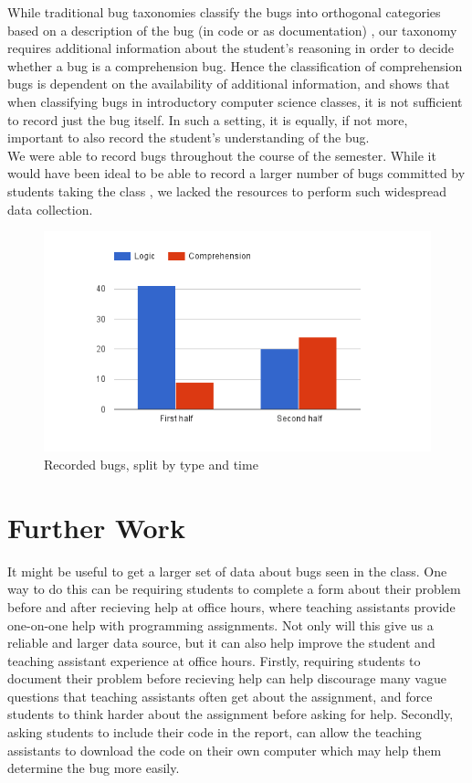 \documentclass{sig-alternate}
\begin{document}
While traditional bug taxonomies classify the bugs into orthogonal categories based on a description of the bug (in code or as documentation) \cite{Beizer90}, our taxonomy requires additional information about the student's reasoning in order to decide whether a bug is a comprehension bug. Hence the classification of comprehension bugs is dependent  on the availability of additional information, and shows that when classifying bugs in introductory computer science classes, it is not sufficient to record just the bug itself. In such a setting, it is equally, if not more, important to also record the student's understanding of the bug.\\

We were able to record \numtotal bugs throughout the course of the semester. While it would have been ideal to be able to record a larger number of bugs committed by students taking the class \cite{BryceCooleyHansenHayrapetyan10}, we lacked the resources to perform such widespread data collection.

\begin{figure}
\centering
\includegraphics[scale=0.41]{figures/types.png}
\caption{Recorded bugs, split by type and time}
\label{fig:types}
\end{figure}


\section{Further Work}
It might be useful to get a larger set of data about bugs seen in the class. One way to do this can be requiring students to complete a form about their problem before and after recieving help at office hours, where teaching assistants provide one-on-one help with programming assignments. Not only will this give us a reliable and larger data source, but it can also help improve the student and teaching assistant experience at office hours. Firstly, requiring students to document their problem before recieving help can help discourage many vague questions that teaching assistants often get about the assignment, and force students to think harder about the assignment before asking for help. Secondly, asking students to include their code in the report, can allow the teaching assistants to download the code on their own computer which may help them determine the bug more easily.\\
\end{document}
